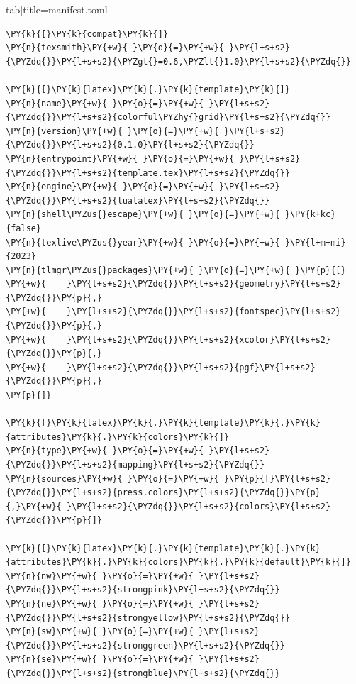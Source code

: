 \documentclass[a4paper,twoside]{article}
\begin{document}
\begin{tsdiv}{tab}[title=manifest.toml]
\begin{tscode}[lang=toml, engine=pygments]
\begin{Verbatim}[commandchars=\\\{\},breaklines, breakanywhere, commandchars=\\\{\}]
\PY{k}{[}\PY{k}{compat}\PY{k}{]}
\PY{n}{texsmith}\PY{+w}{ }\PY{o}{=}\PY{+w}{ }\PY{l+s+s2}{\PYZdq{}}\PY{l+s+s2}{\PYZgt{}=0.6,\PYZlt{}1.0}\PY{l+s+s2}{\PYZdq{}}

\PY{k}{[}\PY{k}{latex}\PY{k}{.}\PY{k}{template}\PY{k}{]}
\PY{n}{name}\PY{+w}{ }\PY{o}{=}\PY{+w}{ }\PY{l+s+s2}{\PYZdq{}}\PY{l+s+s2}{colorful\PYZhy{}grid}\PY{l+s+s2}{\PYZdq{}}
\PY{n}{version}\PY{+w}{ }\PY{o}{=}\PY{+w}{ }\PY{l+s+s2}{\PYZdq{}}\PY{l+s+s2}{0.1.0}\PY{l+s+s2}{\PYZdq{}}
\PY{n}{entrypoint}\PY{+w}{ }\PY{o}{=}\PY{+w}{ }\PY{l+s+s2}{\PYZdq{}}\PY{l+s+s2}{template.tex}\PY{l+s+s2}{\PYZdq{}}
\PY{n}{engine}\PY{+w}{ }\PY{o}{=}\PY{+w}{ }\PY{l+s+s2}{\PYZdq{}}\PY{l+s+s2}{lualatex}\PY{l+s+s2}{\PYZdq{}}
\PY{n}{shell\PYZus{}escape}\PY{+w}{ }\PY{o}{=}\PY{+w}{ }\PY{k+kc}{false}
\PY{n}{texlive\PYZus{}year}\PY{+w}{ }\PY{o}{=}\PY{+w}{ }\PY{l+m+mi}{2023}
\PY{n}{tlmgr\PYZus{}packages}\PY{+w}{ }\PY{o}{=}\PY{+w}{ }\PY{p}{[}
\PY{+w}{    }\PY{l+s+s2}{\PYZdq{}}\PY{l+s+s2}{geometry}\PY{l+s+s2}{\PYZdq{}}\PY{p}{,}
\PY{+w}{    }\PY{l+s+s2}{\PYZdq{}}\PY{l+s+s2}{fontspec}\PY{l+s+s2}{\PYZdq{}}\PY{p}{,}
\PY{+w}{    }\PY{l+s+s2}{\PYZdq{}}\PY{l+s+s2}{xcolor}\PY{l+s+s2}{\PYZdq{}}\PY{p}{,}
\PY{+w}{    }\PY{l+s+s2}{\PYZdq{}}\PY{l+s+s2}{pgf}\PY{l+s+s2}{\PYZdq{}}\PY{p}{,}
\PY{p}{]}

\PY{k}{[}\PY{k}{latex}\PY{k}{.}\PY{k}{template}\PY{k}{.}\PY{k}{attributes}\PY{k}{.}\PY{k}{colors}\PY{k}{]}
\PY{n}{type}\PY{+w}{ }\PY{o}{=}\PY{+w}{ }\PY{l+s+s2}{\PYZdq{}}\PY{l+s+s2}{mapping}\PY{l+s+s2}{\PYZdq{}}
\PY{n}{sources}\PY{+w}{ }\PY{o}{=}\PY{+w}{ }\PY{p}{[}\PY{l+s+s2}{\PYZdq{}}\PY{l+s+s2}{press.colors}\PY{l+s+s2}{\PYZdq{}}\PY{p}{,}\PY{+w}{ }\PY{l+s+s2}{\PYZdq{}}\PY{l+s+s2}{colors}\PY{l+s+s2}{\PYZdq{}}\PY{p}{]}

\PY{k}{[}\PY{k}{latex}\PY{k}{.}\PY{k}{template}\PY{k}{.}\PY{k}{attributes}\PY{k}{.}\PY{k}{colors}\PY{k}{.}\PY{k}{default}\PY{k}{]}
\PY{n}{nw}\PY{+w}{ }\PY{o}{=}\PY{+w}{ }\PY{l+s+s2}{\PYZdq{}}\PY{l+s+s2}{strongpink}\PY{l+s+s2}{\PYZdq{}}
\PY{n}{ne}\PY{+w}{ }\PY{o}{=}\PY{+w}{ }\PY{l+s+s2}{\PYZdq{}}\PY{l+s+s2}{strongyellow}\PY{l+s+s2}{\PYZdq{}}
\PY{n}{sw}\PY{+w}{ }\PY{o}{=}\PY{+w}{ }\PY{l+s+s2}{\PYZdq{}}\PY{l+s+s2}{stronggreen}\PY{l+s+s2}{\PYZdq{}}
\PY{n}{se}\PY{+w}{ }\PY{o}{=}\PY{+w}{ }\PY{l+s+s2}{\PYZdq{}}\PY{l+s+s2}{strongblue}\PY{l+s+s2}{\PYZdq{}}


\end{Verbatim}
\end{tscode}
\end{tsdiv}
\end{document}
